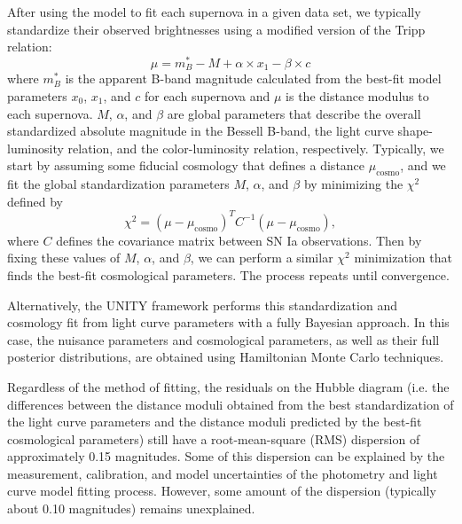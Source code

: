 After using the model to fit each supernova in a given data set, we typically standardize their observed brightnesses using a modified version of the Tripp relation:
\begin{equation}
    \mu = m_B^* - M + \alpha \times x_1 - \beta\times c
    \label{eqn:standardization}
\end{equation}
where $m_B^*$ is the apparent B-band magnitude calculated from the best-fit model parameters $x_0$, $x_1$, and $c$ for each supernova and $\mu$ is the distance modulus to each supernova. $M$, $\alpha$, and $\beta$ are global parameters that describe the overall standardized absolute magnitude in the  Bessell B-band, the light curve shape-luminosity relation, and the color-luminosity relation, respectively. Typically, we start by assuming some fiducial cosmology that defines a distance $\mu_\text{cosmo}$, and we fit the global standardization parameters $M$, $\alpha$, and $\beta$ by minimizing the $\chi^2$ defined by
\begin{equation}
    \chi^2 = (\mu - \mu_\text{cosmo})^T C^{-1} (\mu - \mu_\text{cosmo}),
    \label{eqn:chi2_cosmo_full_cov}
\end{equation}
where $C$ defines the covariance matrix between SN Ia observations. Then by fixing these values of $M$, $\alpha$, and $\beta$, we can perform a similar $\chi^2$ minimization that finds the best-fit cosmological parameters. The process repeats until convergence.

Alternatively, the UNITY framework \citep{rubin_unity_2015} performs this standardization and cosmology fit from light curve parameters with a fully Bayesian approach. In this case, the nuisance parameters and cosmological parameters, as well as their full posterior distributions, are obtained using Hamiltonian Monte Carlo techniques.

Regardless of the method of fitting, the residuals on the Hubble diagram (i.e. the differences between the distance moduli obtained from the best standardization of the light curve parameters and the distance moduli predicted by the best-fit cosmological parameters) still have a root-mean-square (RMS) dispersion of approximately 0.15 magnitudes. Some of this dispersion can be explained by the measurement, calibration, and model uncertainties of the photometry and light curve model fitting process. However, some amount of the dispersion (typically about 0.10 magnitudes) remains unexplained.

